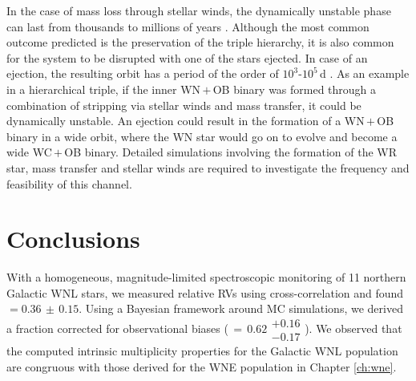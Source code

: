 In the case of mass loss through stellar winds, the dynamically unstable phase can last from thousands to millions of years \citep{toonen_stellar_2022}. Although the most common outcome predicted is the preservation of the triple hierarchy, it is also common for the system to be disrupted with one of the stars ejected. In case of an ejection, the resulting orbit has a period of the order of $10^3$-$10^5\,$d \citep{toonen_stellar_2022}. As an example in a hierarchical triple, if the inner WN\,$+$\,OB binary was formed through a combination of stripping via stellar winds and mass transfer, it could be dynamically unstable. An ejection could result in the formation of a WN\,$+$\,OB binary in a wide orbit, where the WN star would go on to evolve and become a wide WC\,$+$\,OB binary. Detailed simulations involving the formation of the WR star, mass transfer and stellar winds are required to investigate the frequency and feasibility of this channel. 

\section{Conclusions} \label{sect:conclusions_WNL}
With a homogeneous, magnitude-limited spectroscopic monitoring of 11 northern Galactic WNL stars, we measured relative RVs using cross-correlation and found \fobsWNL{}\,$=0.36\,\pm\,0.15$. Using a Bayesian framework around MC simulations, we derived a fraction corrected for observational biases (\fintWNL{}$\,=\,0.62\substack{+0.16 \\ -0.17}$). We observed that the computed intrinsic multiplicity properties for the Galactic WNL population are congruous with those derived for the WNE population in Chapter \ref{ch:wne}. 


